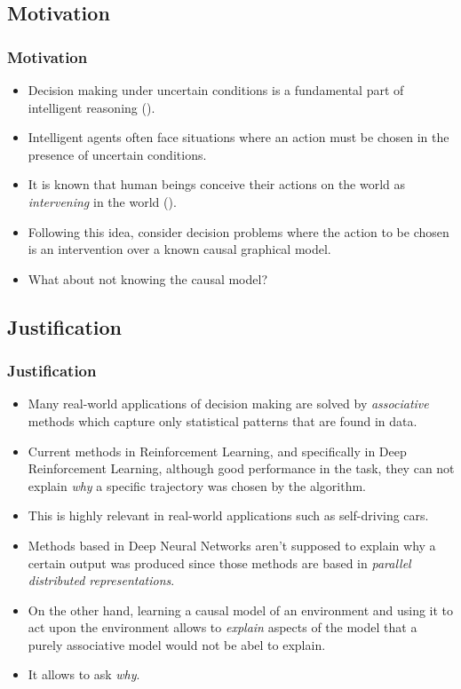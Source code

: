 \documentclass{beamer}
\theoremstyle{plain}
\begin{document}
	\subsection{Motivation}
	\begin{frame}
	\frametitle{Motivation}
	\begin{itemize}
	\item Decision making under uncertain conditions is a fundamental part of intelligent reasoning (\cite{lake2017building}).
	\item Intelligent agents often face situations where an action must be chosen in the presence of uncertain conditions.
	\item It is known that human beings conceive their actions on the world as \textit{intervening} in the world (\cite{hagmayer2009decision}).
	\item Following this idea, \cite{lattimoreNIPS2016} consider decision problems where the action to be chosen is an intervention over a known causal graphical model.
	\item What about not knowing the causal model? 
	\end{itemize}
	\end{frame}
	\subsection{Justification}
	\begin{frame}
	\frametitle{Justification}
	\begin{itemize}
	\item Many real-world applications of decision making are solved by \textit{associative} methods which capture only statistical patterns that are found in data.
	\item Current methods in Reinforcement Learning, and specifically in Deep Reinforcement Learning, although good performance in the task, they can not explain \textit{why} a specific trajectory was chosen by the algorithm.
	\item This is highly relevant in real-world applications such as self-driving cars.
	\item Methods based in Deep Neural Networks aren't supposed to explain why a certain output was produced since those methods are based in \textit{parallel distributed representations}.
	\end{itemize}
	\end{frame}
	\begin{frame}
	\begin{itemize}
	\item On the other hand, learning a causal model of an environment and using it to act upon the environment allows to \textit{explain} aspects of the model that a purely associative model would not be abel to explain. 
	\item It allows to ask \textit{why}.
		\end{itemize}
	\end{frame}
\end{document}
